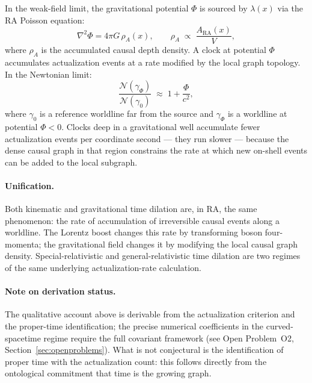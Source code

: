 \documentclass[11pt,a4paper]{article}
\theoremstyle{plain}
\theoremstyle{definition}
\theoremstyle{remark}
\begin{document}
In the weak-field limit, the gravitational potential $\Phi$ is sourced by
$\lambda(x)$ via the RA Poisson equation:
\begin{equation}
  \nabla^2\Phi = 4\pi G\,\rho_A(x),
  \qquad
  \rho_A \;\propto\; \frac{A_{\mathrm{RA}}(x)}{V},
  \label{eq:poisson_grav_dilation}
\end{equation}
where $\rho_A$ is the accumulated causal depth density. A clock at potential
$\Phi$ accumulates actualization events at a rate modified by the local graph
topology. In the Newtonian limit:
\begin{equation}
  \frac{\mathcal{N}(\gamma_{\Phi})}{\mathcal{N}(\gamma_0)}
  \;\approx\; 1 + \frac{\Phi}{c^2},
  \label{eq:grav_dilation}
\end{equation}
where $\gamma_0$ is a reference worldline far from the source and $\gamma_\Phi$
is a worldline at potential $\Phi < 0$. Clocks deep in a gravitational well
accumulate fewer actualization events per coordinate second --- they run slower
--- because the dense causal graph in that region constrains the rate at which
new on-shell events can be added to the local subgraph.

\paragraph{Unification.}
Both kinematic and gravitational time dilation are, in RA, the same phenomenon:
the rate of accumulation of irreversible causal events along a worldline. The
Lorentz boost changes this rate by transforming boson four-momenta; the
gravitational field changes it by modifying the local causal graph density.
Special-relativistic and general-relativistic time dilation are two regimes of
the same underlying actualization-rate calculation.

\paragraph{Note on derivation status.}
The qualitative account above is derivable from the actualization criterion
and the proper-time identification; the precise numerical coefficients in the
curved-spacetime regime require the full covariant framework
(see Open Problem~O2, Section~\ref{sec:openproblems}). What is not
conjectural is the identification of proper time with the actualization count:
this follows directly from the ontological commitment that time is the growing graph.

\end{document}

